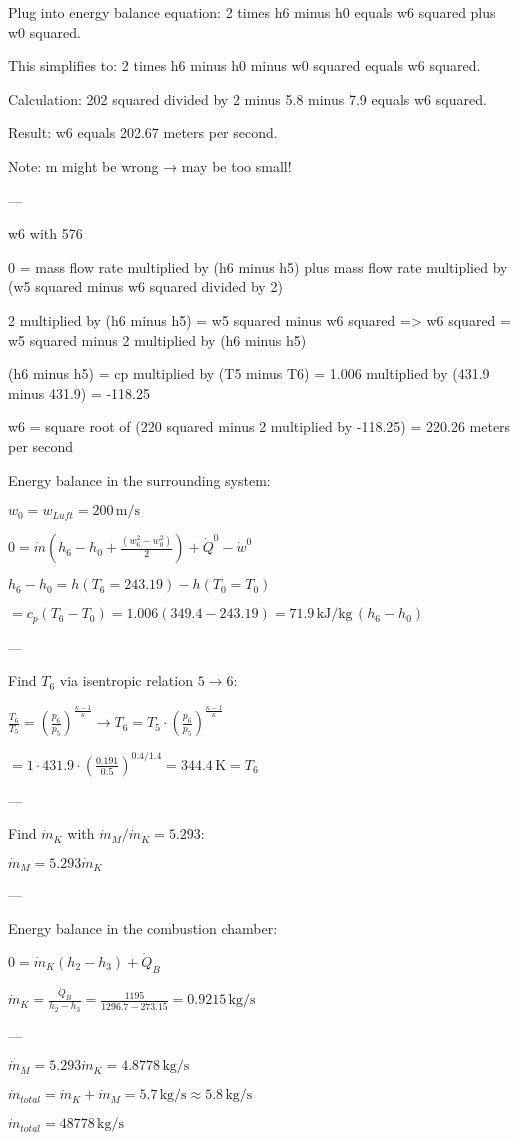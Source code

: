 Plug into energy balance equation:  
2 times h6 minus h0 equals w6 squared plus w0 squared.  

This simplifies to:  
2 times h6 minus h0 minus w0 squared equals w6 squared.  

Calculation:  
202 squared divided by 2 minus 5.8 minus 7.9 equals w6 squared.  

Result:  
w6 equals 202.67 meters per second.  

Note:  
m might be wrong → may be too small!  

---

w6 with 576  

0 = mass flow rate multiplied by (h6 minus h5) plus mass flow rate multiplied by (w5 squared minus w6 squared divided by 2)  

2 multiplied by (h6 minus h5) = w5 squared minus w6 squared  
=> w6 squared = w5 squared minus 2 multiplied by (h6 minus h5)  

(h6 minus h5) = cp multiplied by (T5 minus T6) = 1.006 multiplied by (431.9 minus 431.9) = -118.25  

w6 = square root of (220 squared minus 2 multiplied by -118.25) = 220.26 meters per second

Energy balance in the surrounding system:  

\( w_0 = w_{Luft} = 200 \, \text{m/s} \)  

\( 0 = \dot{m} (h_6 - h_0 + \frac{(w_6^2 - w_0^2)}{2}) + \dot{Q}^0 - \dot{w}^0 \)  

\( h_6 - h_0 = h(T_6 = 243.19) - h(T_0 = T_0) \)  

\( = c_p (T_6 - T_0) = 1.006 (349.4 - 243.19) = 71.9 \, \text{kJ/kg} \, (h_6 - h_0) \)  

---

Find \( T_6 \) via isentropic relation \( 5 \rightarrow 6 \):  

\( \frac{T_6}{T_5} = \left( \frac{p_6}{p_5} \right)^{\frac{\kappa - 1}{\kappa}} \rightarrow T_6 = T_5 \cdot \left( \frac{p_6}{p_5} \right)^{\frac{\kappa - 1}{\kappa}} \)  

\( = 1 \cdot 431.9 \cdot \left( \frac{0.191}{0.5} \right)^{0.4 / 1.4} = 344.4 \, \text{K} = T_6 \)  

---

Find \( \dot{m}_K \) with \( \dot{m}_M / \dot{m}_K = 5.293 \):  

\( \dot{m}_M = 5.293 \dot{m}_K \)  

---

Energy balance in the combustion chamber:  

\( 0 = \dot{m}_K (h_2 - h_3) + \dot{Q}_B \)  

\( \dot{m}_K = \frac{\dot{Q}_B}{h_2 - h_3} = \frac{1195}{1296.7 - 273.15} = 0.9215 \, \text{kg/s} \)  

---

\( \dot{m}_M = 5.293 \dot{m}_K = 4.8778 \, \text{kg/s} \)  

\( \dot{m}_{total} = \dot{m}_K + \dot{m}_M = 5.7 \, \text{kg/s} \approx 5.8 \, \text{kg/s} \)  

\( \dot{m}_{total} = 48778 \, \text{kg/s} \)